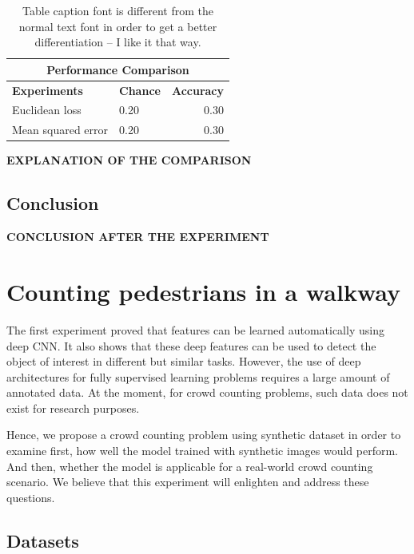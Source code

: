 \begin{table}[H]
\centering
\small\sffamily
\begin{tabular}{llr}
\multicolumn{3}{c}{\textbf{\textbf{Performance Comparison}}} \\
\bottomrule
\textbf{Experiments}  & \textbf{Chance} & \textbf{Accuracy} \\
\bottomrule
Euclidean loss           & 0.20 & 0.30 \\
Mean squared error       & 0.20 & 0.30 \\

\bottomrule
\end{tabular}
\caption{Table caption font is different from the normal text font in order to get a better differentiation -- I like it that way.}
\label{tab:comp}
\end{table} 

\textbf{EXPLANATION OF THE COMPARISON}

\subsection{Conclusion}

\textbf{CONCLUSION AFTER THE EXPERIMENT} 

\section{Counting pedestrians in a walkway}

The first experiment proved that features can be learned automatically using deep CNN. It also shows that these deep features can be used to detect the object of interest in different but similar tasks. However, the use of deep architectures for fully supervised learning problems requires a large amount of annotated data. At the moment, for crowd counting problems, such data does not exist for research purposes. 

Hence, we propose a crowd counting problem using synthetic dataset in order to examine first, how well the model trained with synthetic images would perform. And then, whether the model is applicable for a real-world crowd counting scenario. We believe that this experiment will enlighten and address these questions. 

\subsection{Datasets} 

